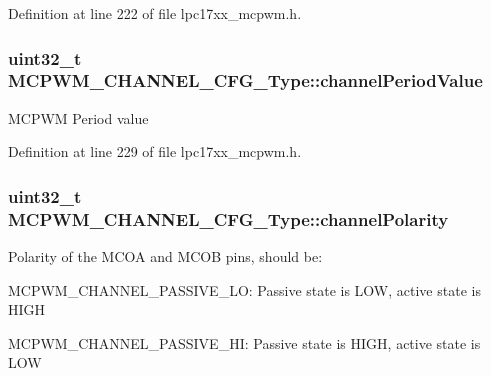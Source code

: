 \-Definition at line 222 of file lpc17xx\-\_\-mcpwm.\-h.

\hypertarget{struct_m_c_p_w_m___c_h_a_n_n_e_l___c_f_g___type_a84254da5df37e034680c7ac5f372e789}{
\subsubsection[{channel\-Period\-Value}]{\setlength{\rightskip}{0pt plus 5cm}uint32\-\_\-t {\bf \-M\-C\-P\-W\-M\-\_\-\-C\-H\-A\-N\-N\-E\-L\-\_\-\-C\-F\-G\-\_\-\-Type\-::channel\-Period\-Value}}}\label{struct_m_c_p_w_m___c_h_a_n_n_e_l___c_f_g___type_a84254da5df37e034680c7ac5f372e789}
\-M\-C\-P\-W\-M \-Period value 

\-Definition at line 229 of file lpc17xx\-\_\-mcpwm.\-h.

\hypertarget{struct_m_c_p_w_m___c_h_a_n_n_e_l___c_f_g___type_a16b872e93890ee57eb783008b406649e}{
\subsubsection[{channel\-Polarity}]{\setlength{\rightskip}{0pt plus 5cm}uint32\-\_\-t {\bf \-M\-C\-P\-W\-M\-\_\-\-C\-H\-A\-N\-N\-E\-L\-\_\-\-C\-F\-G\-\_\-\-Type\-::channel\-Polarity}}}\label{struct_m_c_p_w_m___c_h_a_n_n_e_l___c_f_g___type_a16b872e93890ee57eb783008b406649e}
\-Polarity of the \-M\-C\-O\-A and \-M\-C\-O\-B pins, should be\-:
\begin{DoxyItemize}
\item \-M\-C\-P\-W\-M\-\_\-\-C\-H\-A\-N\-N\-E\-L\-\_\-\-P\-A\-S\-S\-I\-V\-E\-\_\-\-L\-O\-: \-Passive state is \-L\-O\-W, active state is \-H\-I\-G\-H
\item \-M\-C\-P\-W\-M\-\_\-\-C\-H\-A\-N\-N\-E\-L\-\_\-\-P\-A\-S\-S\-I\-V\-E\-\_\-\-H\-I\-: \-Passive state is \-H\-I\-G\-H, active state is \-L\-O\-W 
\end{DoxyItemize}

